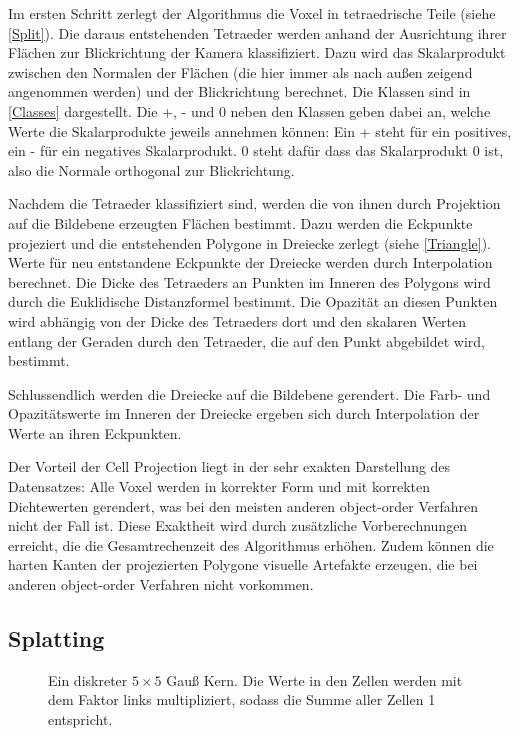 \documentclass[a4paper,fontsize=12pt,toc=bib,halfparskip,ngerman]{scrartcl}
\begin{document}
Im ersten Schritt zerlegt der Algorithmus die Voxel in tetraedrische Teile (siehe \cref{Split}). Die daraus entstehenden Tetraeder werden anhand der Ausrichtung ihrer Fl\"achen zur Blickrichtung der Kamera klassifiziert. Dazu wird das Skalarprodukt zwischen den Normalen der Fl\"achen (die hier immer als nach au{\ss}en zeigend angenommen werden) und der Blickrichtung berechnet. Die Klassen sind in \cref{Classes} dargestellt. Die +, - und 0 neben den Klassen geben dabei an, welche Werte die Skalarprodukte jeweils annehmen k\"onnen: Ein + steht f\"ur ein positives, ein - f\"ur ein negatives Skalarprodukt. 0 steht daf\"ur dass das Skalarprodukt 0 ist, also die Normale orthogonal zur Blickrichtung.

Nachdem die Tetraeder klassifiziert sind, werden die von ihnen durch Projektion auf die Bildebene erzeugten Fl\"achen bestimmt. Dazu werden die Eckpunkte projeziert und die entstehenden Polygone in Dreiecke zerlegt (siehe \cref{Triangle}). Werte f\"ur neu entstandene Eckpunkte der Dreiecke werden durch Interpolation berechnet. Die Dicke des Tetraeders an Punkten im Inneren des Polygons wird durch die Euklidische Distanzformel bestimmt. Die Opazit\"at an diesen Punkten wird abh\"angig von der Dicke des Tetraeders dort und den skalaren Werten entlang der Geraden durch den Tetraeder, die auf den Punkt abgebildet wird, bestimmt.

Schlussendlich werden die Dreiecke auf die Bildebene gerendert. Die Farb- und Opazit\"atswerte im Inneren der Dreiecke ergeben sich durch Interpolation der Werte an ihren Eckpunkten. 

Der Vorteil der Cell Projection liegt in der sehr exakten Darstellung des Datensatzes: Alle Voxel werden in korrekter Form und mit korrekten Dichtewerten gerendert, was bei den meisten anderen object-order Verfahren nicht der Fall ist. Diese Exaktheit wird durch zus\"atzliche Vorberechnungen erreicht, die die Gesamtrechenzeit des Algorithmus erh\"ohen. Zudem k\"onnen die harten Kanten der projezierten Polygone visuelle Artefakte erzeugen, die bei anderen object-order Verfahren nicht vorkommen.

\subsection{Splatting}

\begin{figure}
	\centering
	\caption{Ein diskreter $5\times5$ Gau{\ss} Kern. Die Werte in den Zellen werden mit dem Faktor links multipliziert, sodass die Summe aller Zellen 1 entspricht.}
	\label{kernel}
\end{figure}
\end{document}
